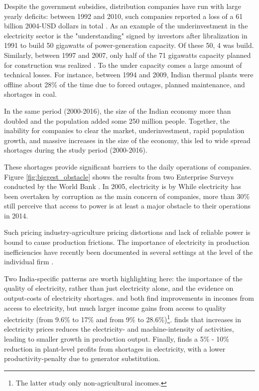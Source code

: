 \documentclass[11pt]{article}
\begin{document}
Despite the government subsidies, distribution companies have run with large yearly deficits: between 1992 and 2010, such companies reported a loss of a 61 billion 2004-USD dollars in total \citep{allcott_how_2016}. As an example of the underinvestment in the electricity sector is the "understanding" signed by investors after libralization in 1991 to build 50 gigawatts of power-generation capacity. Of these 50, 4 was build. Similarly, between 1997 and 2007, only half of the 71 gigawatts capacity planned for construction was realized \citep{cea_planwise_2013}. To the under capacity comes a large amount of technical losses. For instance, between 1994 and 2009, Indian thermal plants were offline about 28\% of the time due to forced outages, planned maintenance, and shortages in coal. 

In the same period (2000-2016), the size of the Indian economy more than doubled and the population added some 250 million people. Together, the inability for companies to clear the market, underinvestment, rapid population growth, and massive increases in the size of the economy, this led to wide spread shortages during the study period (2000-2016). 

These shortages provide significant barriers to the daily operations of companies. Figure \ref{fig:biggest_obstacle} shows the results from two Enterprise Surveys conducted by the World Bank \citep{world_bank_enterprise_2020-1,world_bank_enterprise_2020-2}. In 2005, electricity is by  While electricity has been overtaken by corruption as the main concern of companies, more than 30\% still perceive that access to power is at least a major obstacle to their operations in 2014.

Such pricing industry-agriculture pricing distortions and lack of reliable power is bound to cause production frictions. The importance of electricity in production inefficiencies have recently been documented in several settings at the level of the individual firm \citep{grainger_impact_2017,abeberese_productivity_2019,fisher-vanden_electricity_2015}. 

Two India-specific patterns are worth highlighting here: the importance of the quality of electricity, rather than just electricity alone, and the evidence on output-costs of electricity shortages. \cite{samad_benefits_2016} and \cite{chakravorty_does_2014} both find improvements in incomes from access to electricity, but much larger income gains from access to quality electricity (from 9.6\% to 17\% and from 9\% to 28.6\%)\footnote{The latter study only non-agricultural incomes.}. \cite{abeberese_electricity_2017} finds that increases in electricity prices reduces the electricity- and machine-intensity of activities, leading to smaller growth in production output. Finally, \cite{allcott_how_2016} finds a 5\% - 10\% reduction in plant-level profits from shortages in electricity, with a lower productivity-penalty due to generator substitution.
\end{document}
